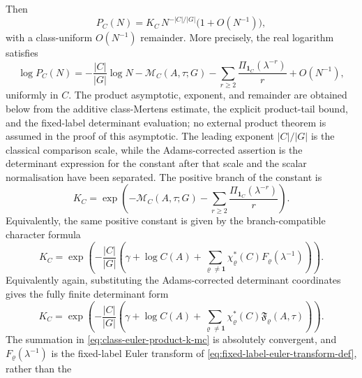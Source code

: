 \begin{theorem}
  Then
  \begin{equation}\label{eq:class-euler-product-asymptotic}
    P_C(N)=K_C\,N^{-|C|/|G|}\bigl(1+O(N^{-1})\bigr),
  \end{equation}
  with a class-uniform \(O(N^{-1})\) remainder.  More precisely, the real
  logarithm satisfies
  \begin{equation}\label{eq:class-euler-product-log-mertens}
    \log P_C(N)
    =
    -\frac{|C|}{|G|}\log N
    -\mathcal M_C(A,\tau;G)
    -\sum_{r\ge2}\frac{\Pi_{\mathbf1_C}(\lambda^{-r})}{r}
    +O(N^{-1}),
  \end{equation}
  uniformly in \(C\).  The product asymptotic, exponent, and remainder are
  obtained below from the additive class-Mertens estimate, the explicit
  product-tail bound, and the fixed-label determinant evaluation; no external
  product theorem is assumed in the proof of this asymptotic.  The leading
  exponent \(|C|/|G|\) is the classical comparison scale, while the
  Adams-corrected assertion is the determinant expression for the constant
  after that scale and the scalar normalisation have been separated.
  The positive branch of the constant is
  \begin{equation}\label{eq:class-euler-product-k-mc}
    K_C=
    \exp\!\left(
      -\mathcal M_C(A,\tau;G)
      -\sum_{r\ge2}\frac{\Pi_{\mathbf1_C}(\lambda^{-r})}{r}
    \right).
  \end{equation}
  Equivalently, the same positive constant is given by the branch-compatible
  character formula
  \begin{equation}\label{eq:class-euler-product-k-f}
    K_C=
    \exp\!\left(
      -\frac{|C|}{|G|}
      \left(
        \gamma+\log C(A)
        +\sum_{\varrho\neq\mathbf1}
          \chi_\varrho^\ast(C)F_\varrho(\lambda^{-1})
      \right)
    \right).
  \end{equation}
  Equivalently again, substituting the Adams-corrected determinant coordinates
  gives the fully finite determinant form
  \begin{equation}\label{eq:class-euler-product-k-det}
    K_C=
    \exp\!\left(
      -\frac{|C|}{|G|}
      \left(
        \gamma+\log C(A)
        +\sum_{\varrho\neq\mathbf1}
          \chi_\varrho^\ast(C)\mathfrak F_\varrho(A,\tau)
      \right)
    \right).
  \end{equation}
  The summation in \eqref{eq:class-euler-product-k-mc} is absolutely
  convergent, and \(F_\varrho(\lambda^{-1})\) is the fixed-label Euler
  transform of \eqref{eq:fixed-label-euler-transform-def}, rather than the

\end{theorem}

